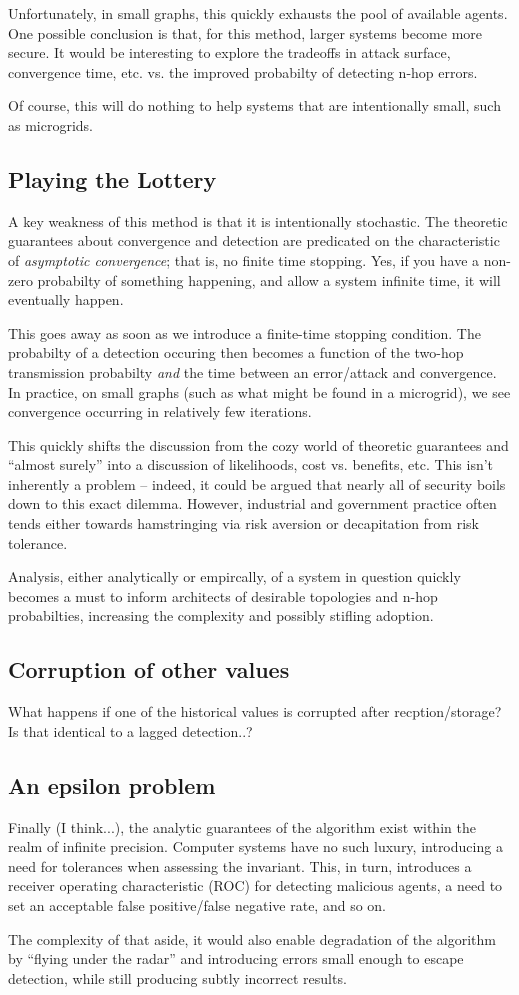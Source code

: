 \documentclass[11pt]{article}
\begin{document}
Unfortunately, in small graphs, this quickly exhausts the pool of available agents.
One possible conclusion is that, for this method, larger systems become more secure.
It would be interesting to explore the tradeoffs in attack surface, convergence time, etc.
vs. the improved probabilty of detecting n-hop errors.

Of course, this will do nothing to help systems that are intentionally small, such as microgrids.

\subsection{Playing the Lottery}
A key weakness of this method is that it is intentionally stochastic. The
theoretic guarantees about convergence and detection are predicated on the
characteristic of \textit{asymptotic convergence}; that is, no finite time
stopping. Yes, if you have a non-zero probabilty of something happening, and
allow a system infinite time, it will eventually happen.

This goes away as soon as we introduce a finite-time stopping condition.
The probabilty of a detection occuring then becomes a function of the
two-hop transmission probabilty \textit{and} the time between an error/attack
and convergence. In practice, on small graphs (such as what might be found in a
microgrid), we see convergence occurring in relatively few iterations.

This quickly shifts the discussion from the cozy world of theoretic guarantees
and ``almost surely'' into a discussion of likelihoods, cost vs. benefits, etc.
This isn't inherently a problem -- indeed, it could be argued that nearly all of
security boils down to this exact dilemma. However, industrial and government
practice often tends either towards hamstringing via risk aversion or
decapitation from risk tolerance.

Analysis, either analytically or empircally, of a system in question quickly
becomes a must to inform architects of desirable topologies and n-hop
probabilties, increasing the complexity and possibly stifling adoption.

\subsection{Corruption of other values}
What happens if one of the historical values is corrupted after
recption/storage? Is that identical to a lagged detection..?


\subsection{An epsilon problem}
Finally (I think...), the analytic guarantees of the algorithm exist within the
realm of infinite precision. Computer systems have no such luxury, introducing a
need for tolerances when assessing the invariant.  This, in turn, introduces a
receiver operating characteristic (ROC) for detecting malicious agents, a need to
set an acceptable false positive/false negative rate, and so on.

The complexity of that aside, it would also enable degradation of the algorithm
by ``flying under the radar'' and introducing errors small enough to escape
detection, while still producing subtly incorrect results.
\end{document}
